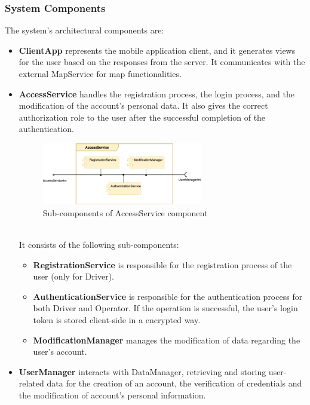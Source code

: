 \documentclass[../main.tex]{subfiles}
\begin{document}
\subsubsection{System Components}
The system's architectural components are:
\begin{itemize}
    \item \textbf{ClientApp} represents the mobile application client, and it generates views for the user based on the responses from the server. It communicates with the external MapService for map functionalities. 
    
    \item \textbf{AccessService} handles the registration process, the login process, and the modification of the account's personal data. It also gives the correct authorization role to the user after the successful completion of the authentication.\\
    \begin{figure}[h]
        \centering
        \includegraphics[width=70mm]{subcomponentDiagram/accessservice.drawio.png}
        \caption{Sub-components of AccessService component}
        \label{fig:subcomponent}
    \end{figure}\\
    It consists of the following sub-components:
    \begin{itemize}
        \item \textbf{RegistrationService} is responsible for the registration process of the user (only for Driver).
        \item \textbf{AuthenticationService} is responsible for the authentication process for both Driver and Operator. If the operation is successful, the user's login token is stored client-side in a encrypted way.
        \item \textbf{ModificationManager} manages the modification of data regarding the user's account.
    \end{itemize}
    \item \textbf{UserManager} interacts with DataManager, retrieving and storing user-related data for the creation of an account, the verification of credentials and the modification of account's personal information.


\end{itemize}
\end{document}
